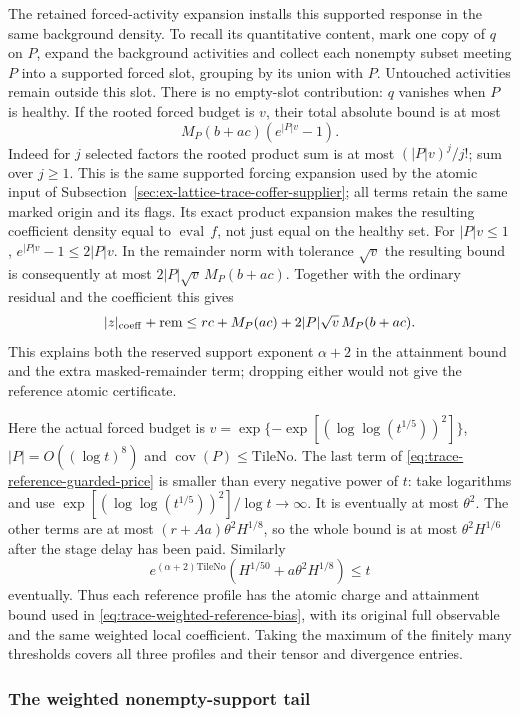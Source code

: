 The retained forced-activity expansion installs this supported response
in the same background density. To recall its quantitative content, mark
one copy of $q$ on $P$, expand the background activities and collect
each nonempty subset meeting $P$ into a supported forced slot, grouping
by its union with $P$. Untouched activities remain outside this slot.
There is no empty-slot contribution: $q$ vanishes when $P$ is healthy.
If the rooted
forced budget is $v$, their total absolute bound is at most
\[
 M_P(b+ac)(e^{|P|v}-1).
\]
Indeed for $j$ selected factors the rooted product sum is at most
$(|P|v)^j/j!$; sum over $j\ge1$. This is the same supported forcing
expansion used by the atomic input of
Subsection~\ref{sec:ex-lattice-trace-coffer-supplier}; all terms retain the
same marked origin and its flags. Its exact product expansion makes the
resulting coefficient density equal to $\operatorname{eval}\,f$, not
just equal on the healthy set. For $|P|v\le1$,
$e^{|P|v}-1\le2|P|v$. In the remainder norm with tolerance $\sqrt v$
the resulting bound is consequently at most
$2|P|\sqrt v\,M_P(b+ac)$. Together with the ordinary residual and the
coefficient this gives
\begin{equation}
 |z|_{\rm coeff}+\mathrm{rem}
 \le rc+M_P(ac)+2|P|\sqrt v\,M_P(b+ac).
 \label{eq:trace-reference-guarded-price}
\end{equation}
This explains both the reserved support exponent $\alpha+2$ in the
attainment bound and the extra masked-remainder term; dropping either
would not give the reference atomic certificate.

Here the actual forced budget is
$v=\exp\{-\exp[(\log\log(t^{1/5}))^2]\}$,
$|P|=O((\log t)^8)$ and
$\operatorname{cov}(P)\le\mathrm{TileNo}$. The last term of
\eqref{eq:trace-reference-guarded-price} is smaller than every negative
power of $t$: take logarithms and use
$\exp[(\log\log(t^{1/5}))^2]/\log t\to\infty$. It is eventually at most $\theta^2$.
The other terms are at most $(r+Aa)\theta^2H^{1/8}$, so the whole bound
is at most $\theta^2H^{1/6}$ after the stage delay has been paid.
Similarly
\[
 e^{(\alpha+2)\mathrm{TileNo}}(H^{1/50}+a\theta^2H^{1/8})\le t
\]
eventually. Thus each reference profile has the atomic charge and
attainment bound used in \eqref{eq:trace-weighted-reference-bias}, with
its original full observable and the same weighted local coefficient.
Taking the maximum of the finitely many thresholds covers all three
profiles and their tensor and divergence entries.

\subsubsection{The weighted nonempty-support tail}
\label{subsec:trace-charge-support-tail}

